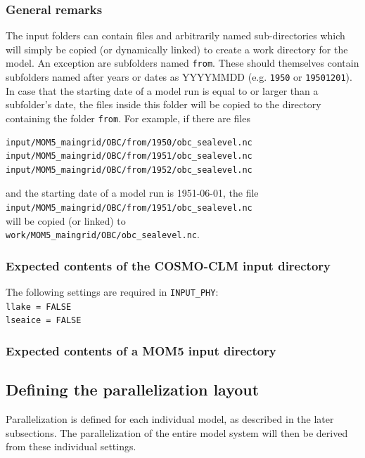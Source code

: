 \documentclass[a4paper,titlepage]{scrartcl}
\begin{document}
\subsubsection{General remarks}
The input folders can contain files and arbitrarily named sub-directories which will simply be copied (or dynamically linked) to create a work directory for the model.
An exception are subfolders named \texttt{from}.
These should themselves contain subfolders named after years or dates as YYYYMMDD (e.g. \texttt{1950} or \texttt{19501201}).
In case that the starting date of a model run is equal to or larger than a subfolder's date, the files inside this folder will be copied to the directory containing the folder \texttt{from}.
For example, if there are files
\begin{verbatim}
input/MOM5_maingrid/OBC/from/1950/obc_sealevel.nc
input/MOM5_maingrid/OBC/from/1951/obc_sealevel.nc
input/MOM5_maingrid/OBC/from/1952/obc_sealevel.nc
\end{verbatim}
and the starting date of a model run is 1951-06-01, the file\\ 
\texttt{input/MOM5\_maingrid/OBC/from/1951/obc\_sealevel.nc}\\
will be copied (or linked) to \\
\texttt{work/MOM5\_maingrid/OBC/obc\_sealevel.nc}.

\subsubsection{Expected contents of the COSMO-CLM input directory}
The following settings are required in \texttt{INPUT\_PHY}:\\
\texttt{llake = FALSE}\\
\texttt{lseaice = FALSE}

\subsubsection{Expected contents of a MOM5 input directory}

\subsection{Defining the parallelization layout}
Parallelization is defined for each individual model, as described in the later subsections.
The parallelization of the entire model system will then be derived from these individual settings.
\end{document}

